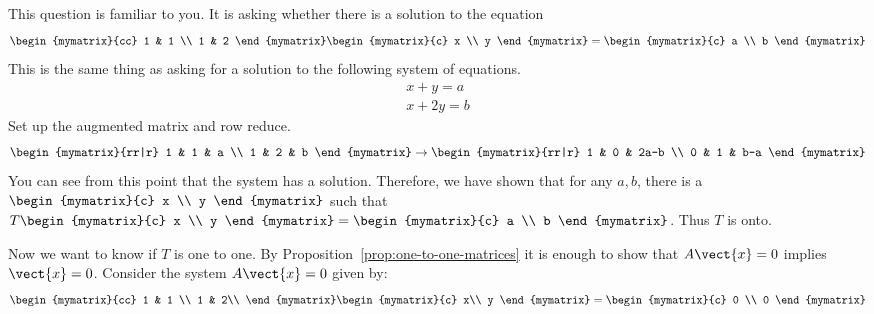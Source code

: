 \begin{solution}
This question is familiar to you. It is asking whether
there is a solution to the equation
\begin{equation*}
\begin{mymatrix}{cc}
1 & 1 \\
1 & 2
\end{mymatrix} \begin{mymatrix}{c}
x \\
y
\end{mymatrix} =\begin{mymatrix}{c}
a \\
b
\end{mymatrix}
\end{equation*}
This is the same thing as asking for a solution to the following system of
equations.
\begin{equation*}
\begin{array}{c}
x+y=a \\
x+2y=b
\end{array}
\end{equation*}
Set up the augmented matrix and row reduce.
\begin{equation}
\begin{mymatrix}{rr|r}
1 & 1 & a \\
1 & 2 & b
\end{mymatrix} \rightarrow \begin{mymatrix}{rr|r}
1 & 0 & 2a-b \\
0 & 1 & b-a
\end{mymatrix}
\label{onto-matrix}
\end{equation}
You can see from this point that the system has a solution. Therefore,
we have shown that for any $a, b$, there is a $
\begin{mymatrix}{c}
x \\
y
\end{mymatrix}$ such that $T\begin{mymatrix}{c}
x \\
y
\end{mymatrix} =\begin{mymatrix}{c}
a \\
b
\end{mymatrix}$.
Thus $T$ is onto.

Now we want to know if $T$ is one to one. 
By Proposition~\ref{prop:one-to-one-matrices} it is enough to show that $A\vect{x}=0$ implies $\vect{x}=0$. 
Consider the system $A\vect{x}=0$ given by:
\begin{equation*}
\begin{mymatrix}{cc}
1 & 1 \\
1 & 2\\
\end{mymatrix}
\begin{mymatrix}{c}
x\\
y
\end{mymatrix}
=
\begin{mymatrix}{c}
0 \\
0
\end{mymatrix}
\end{equation*}


\end{solution}
